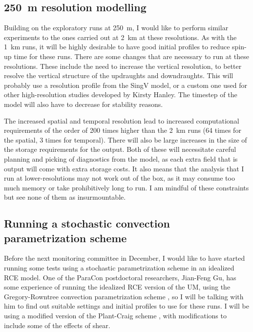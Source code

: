 \documentclass[11pt,a4paper]{article}
\begin{document}
\subsection{\SI{250}{m} resolution modelling}
\label{sec:250m_res}

Building on the exploratory runs at \SI{250}{m}, I would like to perform similar experiments to the ones carried out at \SI{2}{km} at these resolutions. As with the \SI{1}{km} runs, it will be highly desirable to have good initial profiles to reduce spin-up time for these runs. There are some changes that are necessary to run at these resolutions. These include the need to increase the vertical resolution, to better resolve the vertical structure of the updraughts and downdraughts. This will probably use a resolution profile from the SingV model, or a custom one used for other high-resolution studies developed by Kirsty Hanley. The timestep of the model will also have to decrease for stability reasons. 

The increased spatial and temporal resolution lead to increased computational requirements of the order of 200 times higher than the \SI{2}{km} runs (64 times for the spatial, 3 times for temporal). There will also be large increases in the size of the storage requirements for the output. Both of these will necessitate careful planning and picking of diagnostics from the model, as each extra field that is output will come with extra storage costs. It also means that the analysis that I run at lower-resolutions may not work out of the box, as it may consume too much memory or take prohibitively long to run. I am mindful of these constraints but see none of them as insurmountable.

\subsection{Running a stochastic convection parametrization scheme}

Before the next monitoring committee in December, I would like to have started running some tests using a stochastic parametrization scheme in an idealized RCE model. One of the ParaCon postdoctoral researchers, Jian-Feng Gu, has some experience of running the idealized RCE version of the UM, using the Gregory-Rowntree convection parametrization scheme \parencite{gregory1990mass}, so I will be talking with him to find out suitable settings and initial profiles to use for these runs. I will be using a modified version of the Plant-Craig scheme \parencite{plant2008stochastic}, with modifications to include some of the effects of shear.
\end{document}
